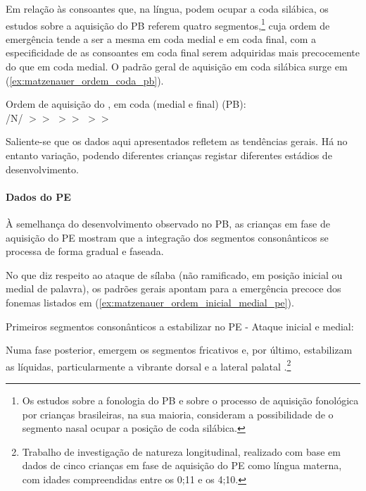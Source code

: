 \documentclass[output=paper]{LSP/langsci}
\begin{document}
Em relação às consoantes que, na língua, podem ocupar a coda silábica, os estudos sobre a aquisição do PB referem quatro segmentos,\footnote{Os estudos sobre a fonologia do PB e sobre o processo de aquisição fonológica por crianças brasileiras, na sua maioria, consideram a possibilidade de o segmento nasal ocupar a posição de coda silábica.} cuja ordem de emergência tende a ser a mesma em coda medial e em coda final, com a especificidade de as consoantes em coda final serem adquiridas mais precocemente do que em coda medial. O padrão geral de aquisição em coda silábica surge em (\ref{ex:matzenauer_ordem_coda_pb}).

\begin{exe}
\ex\label{ex:matzenauer_ordem_coda_pb} Ordem de aquisição do , em coda (medial e final) (PB):\\/N/ $>>$  $>>$  $>>$ 
\end{exe}

Saliente-se que os dados aqui apresentados refletem as tendências gerais. Há no entanto variação, podendo diferentes crianças registar diferentes estádios de desenvolvimento.

\paragraph*{Dados do PE}

À semelhança do desenvolvimento observado no PB, as crianças em fase de aquisição do PE mostram que a integração dos segmentos consonânticos se processa de forma gradual e faseada. 

No que diz respeito ao ataque de sílaba (não ramificado, em posição inicial ou medial de palavra), os padrões gerais apontam para a emergência precoce dos fonemas listados em  (\ref{ex:matzenauer_ordem_inicial_medial_pe}).

\begin{exe}
\ex\label{ex:matzenauer_ordem_inicial_medial_pe} Primeiros segmentos consonânticos a estabilizar no PE - Ataque inicial e medial:\\
\end{exe}

Numa fase posterior, emergem os segmentos fricativos e, por último, estabilizam as líquidas, particularmente a vibrante dorsal e a lateral palatal \citep{costa2010}.\footnote{Trabalho de investigação de natureza longitudinal, realizado com base em dados de cinco crianças em fase de aquisição do PE como língua materna, com idades compreendidas entre os 0;11 e os 4;10.}
\end{document}
